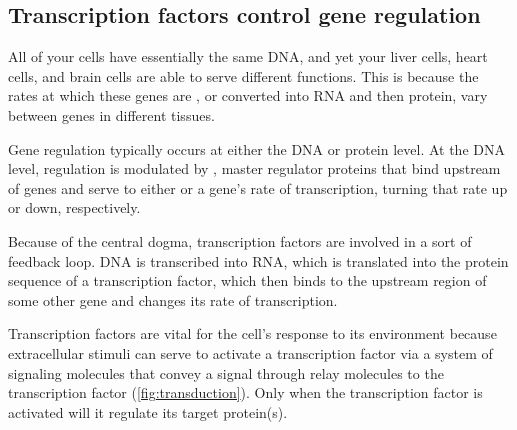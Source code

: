 \subsection{Transcription factors control gene regulation}

All of your cells have essentially the same DNA, and yet your liver cells, heart cells, and brain cells are able to serve different functions. This is because the rates at which these genes are , or converted into RNA and then protein, vary between genes in different tissues.

Gene regulation typically occurs at either the DNA or protein level. At the DNA level, regulation is modulated by , master regulator proteins that bind upstream of genes and serve to either  or  a gene's rate of transcription, turning that rate up or down, respectively.

Because of the central dogma, transcription factors are involved in a sort of feedback loop. DNA is transcribed into RNA, which is translated into the protein sequence of a transcription factor, which then binds to the upstream region of some other gene and changes its rate of transcription.

Transcription factors are vital for the cell's response to its environment because extracellular stimuli can serve to activate a transcription factor via a system of signaling molecules that convey a signal through relay molecules to the transcription factor (\autoref{fig:transduction}). Only when the transcription factor is activated will it regulate its target protein(s).\\


